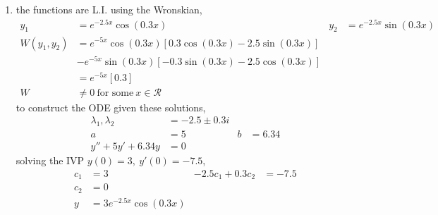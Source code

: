 \begin{enumerate}
    \item the functions are L.I. using the Wronskian,
          \begin{align}
              y_{1}           & = e^{-2.5x}\cos(0.3x)                               &
              y_{2}           & = e^{-2.5x}\sin(0.3x)                                 \\
              W(y_{1}, y_{2}) & = e^{-5x}\cos(0.3x)[0.3\cos(0.3x) - 2.5\sin(0.3x)]    \\
                              & - e^{-5x}\sin(0.3x)[-0.3\sin(0.3x) - 2.5\cos(0.3x)]   \\
                              & = e^{-5x}[0.3]                                        \\
              W               & \neq 0\ \text{for some}\ x \in \mathcal{R}
          \end{align}
          to construct the ODE given these solutions,
          \begin{align}
              \lambda_{1}, \lambda_{2} & = -2.5 \pm 0.3i              \\
              a                        & = 5             & b & = 6.34 \\
              y'' + 5y' + 6.34y        & = 0
          \end{align}
          solving the IVP $ y(0) = 3,\ y'(0) = -7.5 $,
          \begin{align}
              c_{1} & = 3                    & -2.5c_{1} + 0.3c_{2} & = -7.5 \\
              c_{2} & = 0                                                    \\
              y     & = 3e^{-2.5x}\cos(0.3x)
          \end{align}


\end{enumerate}
